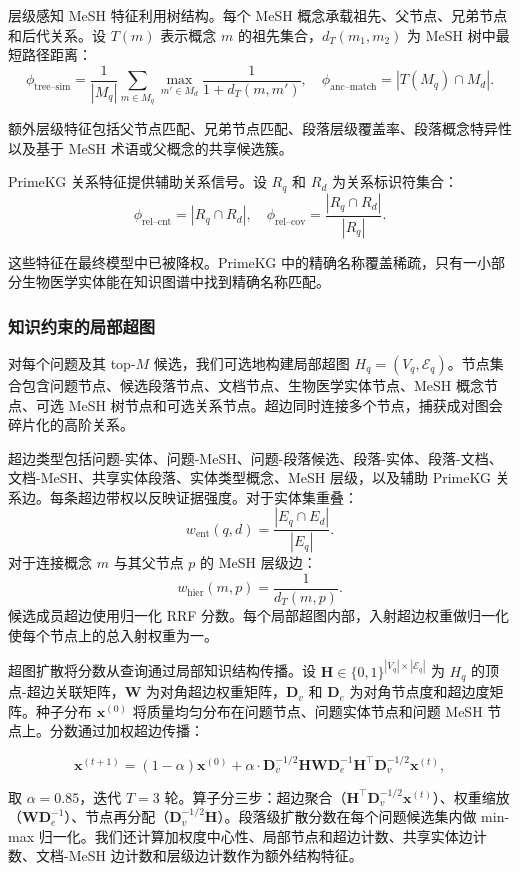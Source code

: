 层级感知 MeSH 特征利用树结构。每个 MeSH 概念承载祖先、父节点、兄弟节点和后代关系。设 $T(m)$ 表示概念 $m$ 的祖先集合，$d_T(m_1, m_2)$ 为 MeSH 树中最短路径距离：
\[
  \phi_{\text{tree--sim}} = \frac{1}{|M_q|}\sum_{m \in M_q} \max_{m' \in M_d} \frac{1}{1 + d_T(m, m')}, \quad
  \phi_{\text{anc--match}} = |T(M_q) \cap M_d|.
\]

额外层级特征包括父节点匹配、兄弟节点匹配、段落层级覆盖率、段落概念特异性以及基于 MeSH 术语或父概念的共享候选簇。

PrimeKG 关系特征提供辅助关系信号。设 $R_q$ 和 $R_d$ 为关系标识符集合：
\[
  \phi_{\text{rel--cnt}} = |R_q \cap R_d|, \quad
  \phi_{\text{rel--cov}} = \frac{|R_q \cap R_d|}{|R_q|}.
\]

这些特征在最终模型中已被降权。PrimeKG 中的精确名称覆盖稀疏，只有一小部分生物医学实体能在知识图谱中找到精确名称匹配。

\subsubsection{知识约束的局部超图}

对每个问题及其 top-$M$ 候选，我们可选地构建局部超图 $H_q=(V_q,\mathcal{E}_q)$。节点集合包含问题节点、候选段落节点、文档节点、生物医学实体节点、MeSH 概念节点、可选 MeSH 树节点和可选关系节点。超边同时连接多个节点，捕获成对图会碎片化的高阶关系。

超边类型包括问题-实体、问题-MeSH、问题-段落候选、段落-实体、段落-文档、文档-MeSH、共享实体段落、实体类型概念、MeSH 层级，以及辅助 PrimeKG 关系边。每条超边带权以反映证据强度。对于实体集重叠：
\[
  w_{\text{ent}}(q,d) = \frac{|E_q \cap E_d|}{|E_q|}.
\]
对于连接概念 $m$ 与其父节点 $p$ 的 MeSH 层级边：
\[
  w_{\text{hier}}(m,p) = \frac{1}{d_T(m,p)}.
\]
候选成员超边使用归一化 RRF 分数。每个局部超图内部，入射超边权重做归一化使每个节点上的总入射权重为一。

超图扩散将分数从查询通过局部知识结构传播。设 $\mathbf{H} \in \{0,1\}^{|V_q| \times |\mathcal{E}_q|}$ 为 $H_q$ 的顶点-超边关联矩阵，$\mathbf{W}$ 为对角超边权重矩阵，$\mathbf{D}_v$ 和 $\mathbf{D}_e$ 为对角节点度和超边度矩阵。种子分布 $\mathbf{x}^{(0)}$ 将质量均匀分布在问题节点、问题实体节点和问题 MeSH 节点上。分数通过加权超边传播：

\[
  \mathbf{x}^{(t+1)} = (1-\alpha)\mathbf{x}^{(0)} + \alpha \cdot \mathbf{D}_v^{-1/2} \mathbf{H} \mathbf{W} \mathbf{D}_e^{-1} \mathbf{H}^\top \mathbf{D}_v^{-1/2} \mathbf{x}^{(t)},
\]

取 $\alpha=0.85$，迭代 $T=3$ 轮。算子分三步：超边聚合（$\mathbf{H}^\top \mathbf{D}_v^{-1/2} \mathbf{x}^{(t)}$）、权重缩放（$\mathbf{W} \mathbf{D}_e^{-1}$）、节点再分配（$\mathbf{D}_v^{-1/2} \mathbf{H}$）。段落级扩散分数在每个问题候选集内做 min-max 归一化。我们还计算加权度中心性、局部节点和超边计数、共享实体边计数、文档-MeSH 边计数和层级边计数作为额外结构特征。

